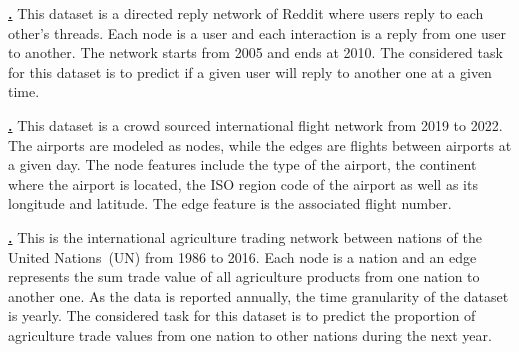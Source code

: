 \underline{\textbf{\reddit.}} This dataset is a directed reply network of Reddit where users reply to each other's threads. Each node is a user and each interaction is a reply from one user to another. 
The network starts from 2005 and ends at 2010. The considered task for this dataset is to predict if a given user will reply to another one at a given time.


\underline{\textbf{\sky.}}  This dataset is a crowd sourced international flight network from 2019 to 2022. The airports are modeled as nodes, while the edges are flights between airports at a given day. The node features include the type of the airport, the continent where the airport is located, the ISO region code of the airport as well as its longitude and latitude. 
The edge feature is the associated flight number. 



\underline{\textbf{\trade.}} This is the international agriculture trading network between nations of the United Nations~(UN) from 1986 to 2016. Each node is a nation and an edge represents the sum trade value of all agriculture products from one nation to another one. As the data is reported annually, the time granularity of the dataset is yearly. 
The considered task for this dataset is to predict the proportion of agriculture trade values from one nation to other nations during the next year. 


